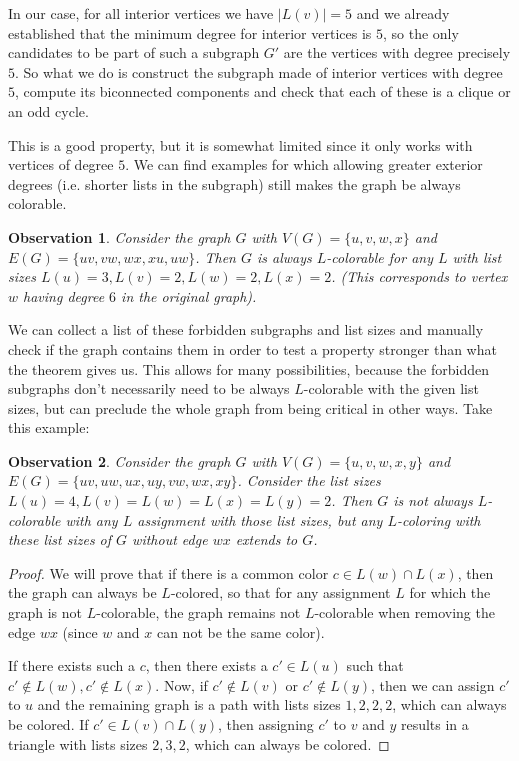 \documentclass{article}
\newtheorem{observation}{Observation}
\begin{document}
In our case, for all interior vertices we have $|L(v)| = 5$ and we already established that the minimum degree for interior vertices is $5$, so the only candidates to be part of such a subgraph $G'$ are the vertices with degree precisely $5$. So what we do is construct the subgraph made of interior vertices with degree $5$, compute its biconnected components and check that each of these is a clique or an odd cycle. 

This is a good property, but it is somewhat limited since it only works with vertices of degree $5$. We can find examples for which allowing greater exterior degrees (i.e. shorter lists in the subgraph) still makes the graph be always colorable.

\begin{observation}
Consider the graph $G$ with $V(G) = \{u, v, w, x\}$ and $E(G) = \{uv, vw, wx, xu, uw\}$. Then $G$ is always $L$-colorable for any $L$ with list sizes $L(u) = 3, L(v) = 2, L(w) = 2, L(x) = 2$. (This corresponds to vertex $w$ having degree $6$ in the original graph).
\end{observation} 

We can collect a list of these forbidden subgraphs and list sizes and manually check if the graph contains them in order to test a property stronger than what the theorem gives us. This allows for many possibilities, because the forbidden subgraphs don't necessarily need to be always $L$-colorable with the given list sizes, but can preclude the whole graph from being critical in other ways. Take this example:

\begin{observation}
Consider the graph $G$ with $V(G) = \{u, v, w, x, y\}$ and $E(G) = \{uv, uw, ux, uy, vw, wx, xy \}$. Consider the list sizes $L(u) = 4, L(v) = L(w) = L(x) = L(y) = 2$. Then $G$ is not always $L$-colorable with any $L$ assignment with those list sizes, but any $L$-coloring with these list sizes of $G$ without edge $wx$ extends to $G$.
\end{observation}

\begin{proof}
We will prove that if there is a common color $c \in L(w) \cap L(x)$, then the graph can always be $L$-colored, so that for any assignment $L$ for which the graph is not $L$-colorable, the graph remains not $L$-colorable when removing the edge $wx$ (since $w$ and $x$ can not be the same color).

If there exists such a $c$, then there exists a $c' \in L(u)$ such that $c' \not\in L(w), c' \not\in L(x)$. Now, if $c' \not\in L(v)$ or $c' \not\in L(y)$, then we can assign $c'$ to $u$ and the remaining graph is a path with lists sizes $1, 2, 2, 2$, which can always be colored. If $c' \in L(v) \cap L(y)$, then assigning $c'$ to $v$ and $y$ results in a triangle with lists sizes $2, 3, 2$, which can always be colored.
\end{proof}
\end{document}
